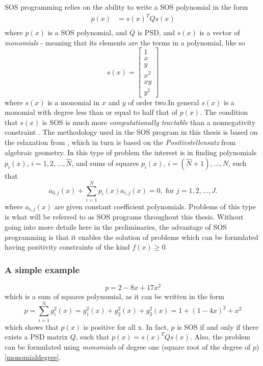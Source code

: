 \ac{SOS} programming relies on the ability to write a SOS polynomial in the form
\begin{align*}
  p(x) &= s(x)^TQs(x)\\
\end{align*}
where \(p(x)\) is a \ac{SOS} polynomial, and \(Q\) is \ac{PSD}, and \(s(x)\) is
a vector of \textit{monomials} - meaning that its elements are the terms in a
polynomial, like so
\[
  s(x) = \begin{bmatrix} 1 \\ x \\ y \\ x^2 \\ xy \\ y^2 \end{bmatrix}
\]
where \(s(x)\) is a monomial in \(x\) and \(y\) of order two.In general \(s(x)\)
is a monomial with degree less than or equal to half that of
\(p(x)\)\cite{parilloStructuredSemidefinitePrograms}\label{monomialdegree}. The
condition that \(s(x)\) is \ac{SOS} is much more \textit{computationally
  tractable} than a nonnegativity constraint
\cite{parilloStructuredSemidefinitePrograms}. The methodology used in the
\ac{SOS} program in this thesis is based on the relaxation from
\cite{parilloStructuredSemidefinitePrograms}, which in turn is based on the
\textit{Positivstellensatz} from algebraic geometry. In this type of problem the
interest is in finding polynomials \(p_i(x), \, i=1,2,\ldots,\hat{N}\), and sums
of squares \(p_i(x), \, i=(\hat{N}+1),\ldots,N\), such that
\[
  a_{0,j}(x) + \sum_{i=1}^{N}p_{i}(x)a_{i,j}(x) = 0, \; \text{for } j =
  1,2,\ldots,J.
\]
where \(a_{i,j}(x)\) are given constant coefficient polynomials. Problems of
this type is what will be referred to as \ac{SOS} programs throughout this
thesis\cite{sostools}. Without going into more details here in the
preliminaries, the advantage of \ac{SOS} programming is that it enables the
solution of problems which can be formulated having positivity constraints of
the kind \(f(x) \geq 0\).

\subsubsection{A simple example}

\[
  p = 2 - 8x + 17x^2
\]
which is a sum of squares polynomial, as it can be written in the form
\[
  p = \sum_{i=1}^{N}g_i^2(x) = g_1^2(x) + g_2^2(x) + g_3^2(x)= 1 + (1-4x)^2 +
  x^2
\]
which shows that \(p(x)\) is positive for all x. In fact, \(p\) is \ac{SOS} if
and only if there exists a \acl{PSD} matrix \(Q\), such that \(p(x) =
s(x)^TQs(x)\). Also, the problem can be formulated using \textit{monomials} of
degree one (square root of the degree of \(p\))\ref{monomialdegree}.

